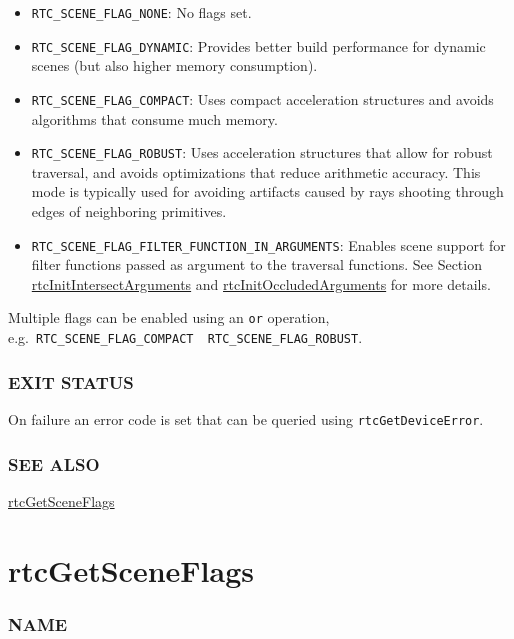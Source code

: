 \begin{itemize}
\item
  \texttt{RTC\_SCENE\_FLAG\_NONE}: No flags set.
\item
  \texttt{RTC\_SCENE\_FLAG\_DYNAMIC}: Provides better build performance
  for dynamic scenes (but also higher memory consumption).
\item
  \texttt{RTC\_SCENE\_FLAG\_COMPACT}: Uses compact acceleration
  structures and avoids algorithms that consume much memory.
\item
  \texttt{RTC\_SCENE\_FLAG\_ROBUST}: Uses acceleration structures that
  allow for robust traversal, and avoids optimizations that reduce
  arithmetic accuracy. This mode is typically used for avoiding
  artifacts caused by rays shooting through edges of neighboring
  primitives.
\item
  \texttt{RTC\_SCENE\_FLAG\_FILTER\_FUNCTION\_IN\_ARGUMENTS}: Enables
  scene support for filter functions passed as argument to the traversal
  functions. See Section
  \hyperref[rtcinitintersectarguments]{rtcInitIntersectArguments} and
  \hyperref[rtcinitoccludedarguments]{rtcInitOccludedArguments} for more
  details.
\end{itemize}

Multiple flags can be enabled using an \texttt{or} operation,
e.g.~\texttt{RTC\_SCENE\_FLAG\_COMPACT\ \textbar{}\ RTC\_SCENE\_FLAG\_ROBUST}.

\subsubsection{EXIT STATUS}\label{exit-status}

On failure an error code is set that can be queried using
\texttt{rtcGetDeviceError}.

\subsubsection{SEE ALSO}\label{see-also}

\hyperref[rtcgetsceneflags]{rtcGetSceneFlags}

\pagebreak

\section{rtcGetSceneFlags}\label{rtcgetsceneflags}

\subsubsection{NAME}\label{name}

